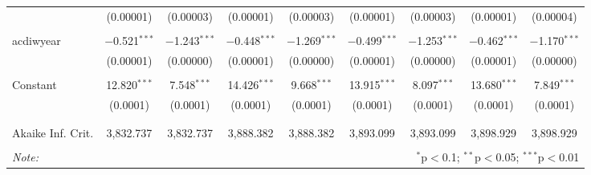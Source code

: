 \begin{table}[!htbp]
\begin{tabular}{@{\extracolsep{5pt}}lcccccccc}
  & (0.00001) & (0.00003) & (0.00001) & (0.00003) & (0.00001) & (0.00003) & (0.00001) & (0.00004) \\ 
  & & & & & & & & \\ 
 acdiwyear & $-$0.521$^{***}$ & $-$1.243$^{***}$ & $-$0.448$^{***}$ & $-$1.269$^{***}$ & $-$0.499$^{***}$ & $-$1.253$^{***}$ & $-$0.462$^{***}$ & $-$1.170$^{***}$ \\ 
  & (0.00001) & (0.00000) & (0.00001) & (0.00000) & (0.00001) & (0.00000) & (0.00001) & (0.00000) \\ 
  & & & & & & & & \\ 
 Constant & 12.820$^{***}$ & 7.548$^{***}$ & 14.426$^{***}$ & 9.668$^{***}$ & 13.915$^{***}$ & 8.097$^{***}$ & 13.680$^{***}$ & 7.849$^{***}$ \\ 
  & (0.0001) & (0.0001) & (0.0001) & (0.0001) & (0.0001) & (0.0001) & (0.0001) & (0.0001) \\ 
  & & & & & & & & \\ 
\hline \\[-1.8ex] 
Akaike Inf. Crit. & 3,832.737 & 3,832.737 & 3,888.382 & 3,888.382 & 3,893.099 & 3,893.099 & 3,898.929 & 3,898.929 \\ 
\hline 
\hline \\[-1.8ex] 
\textit{Note:}  & \multicolumn{8}{r}{$^{*}$p$<$0.1; $^{**}$p$<$0.05; $^{***}$p$<$0.01} \\ 
\end{tabular} 
\end{table} 
